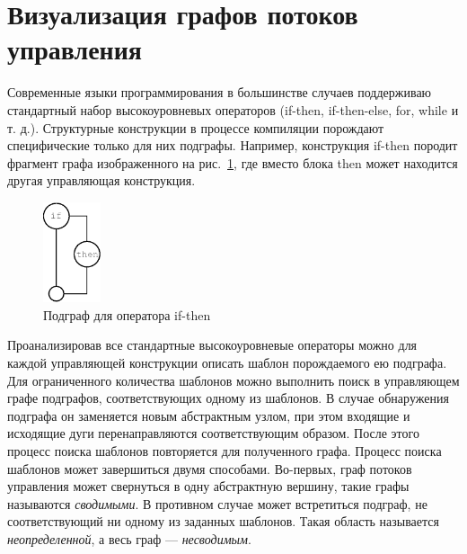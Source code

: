 \documentclass{jctart15a}
\begin{document}

\section{Визуализация графов потоков управления}

Современные языки программирования в большинстве случаев поддерживаю стандартный набор высокоуровневых операторов (if-then, if-then-else, for, while и т. д.). Структурные конструкции в процессе компиляции порождают специфические только для них подграфы. Например, конструкция if-then породит фрагмент графа изображенного на рис.~\ref{fig:IfSt}, где вместо блока then может находится другая управляющая конструкция.

\begin{figure}[htbp]
	\centering
		\includegraphics[width=0.15\textwidth]{Pic/Pic2.eps}
	\caption{Подграф для оператора if-then}
	\label{fig:IfSt}
\end{figure}

Проанализировав все стандартные высокоуровневые операторы можно для каждой управляющей конструкции описать шаблон порождаемого ею подграфа. Для ограниченного количества шаблонов можно выполнить поиск в управляющем графе подграфов, соответствующих одному из шаблонов. В случае обнаружения подграфа он заменяется новым абстрактным узлом, при этом входящие и исходящие дуги перенаправляются соответствующим образом. После этого процесс поиска шаблонов повторяется для полученного графа. Процесс поиска шаблонов может завершиться двумя способами. Во-первых, граф потоков управления может свернуться в одну абстрактную вершину, такие графы называются \emph{сводимыми}. В противном случае может встретиться подграф, не соответствующий ни одному из заданных шаблонов. Такая область называется \emph{неопределенной}, а весь граф --- \emph{несводимым}.

\end{document}

